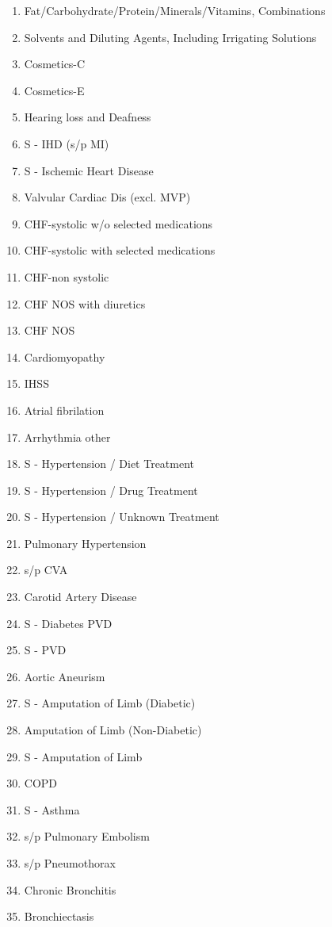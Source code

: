 \documentclass[a4paper,12pt]{article}
\begin{document}
\begin{appendices}
\begin{enumerate}
   			\item Fat/Carbohydrate/Protein/Minerals/Vitamins, Combinations
   			\item Solvents and Diluting Agents, Including Irrigating Solutions
   			\item Cosmetics-C
   			\item Cosmetics-E
   			\item Hearing loss and Deafness
   			\item S - IHD (s/p MI)
   			\item S - Ischemic Heart Disease
   			\item Valvular Cardiac Dis (excl. MVP)
   			\item CHF-systolic w/o selected medications
   			\item CHF-systolic with selected medications
   			\item CHF-non systolic
   			\item CHF NOS with diuretics
   			\item CHF NOS
   			\item Cardiomyopathy
   			\item IHSS
   			\item Atrial fibrilation
   			\item Arrhythmia other
   			\item S - Hypertension / Diet Treatment
   			\item S - Hypertension / Drug Treatment
   			\item S - Hypertension / Unknown Treatment
   			\item Pulmonary Hypertension
   			\item s/p CVA
   			\item Carotid Artery Disease
   			\item S - Diabetes PVD
   			\item S - PVD
   			\item Aortic Aneurism
   			\item S - Amputation of Limb (Diabetic)
   			\item Amputation of Limb (Non-Diabetic)
   			\item S - Amputation of Limb
   			\item COPD
   			\item S - Asthma
   			\item s/p Pulmonary Embolism
   			\item s/p Pneumothorax
   			\item Chronic Bronchitis
   			\item Bronchiectasis

\end{enumerate}
\end{appendices}
\end{document}
